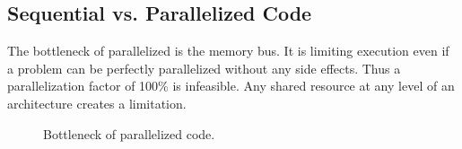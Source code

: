 \subsection*{Sequential vs. Parallelized Code}

\par{
	\noindent
	The bottleneck of parallelized is the memory bus. It is limiting execution even if a problem can be perfectly parallelized without any side effects. Thus a parallelization factor of 100\% is infeasible. Any shared resource at any level of an architecture creates a limitation.
}

\par{
	\begin{figure}[!htb]
		\centering
		\caption{Bottleneck of parallelized code.}
		\label{fig:parallelismbottleneck}
	\end{figure}	
}
